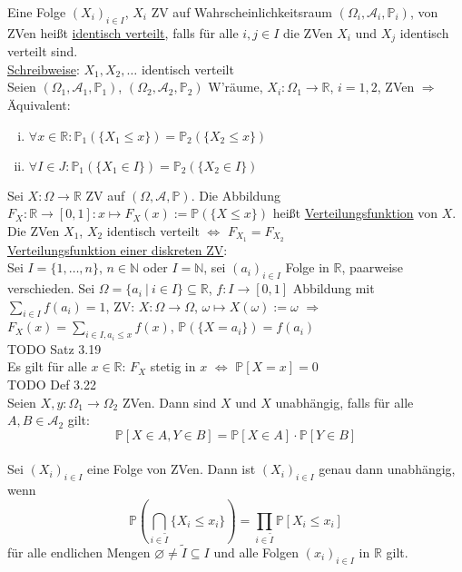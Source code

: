 \documentclass[a4paper]{article}
\newcommand{\ul}{\underline}
\begin{document}
Eine Folge $(X_i)_{i\in I}$, $X_i$ ZV auf Wahrscheinlichkeitsraum $(\Omega_i,\mathcal{A}_i,\mathbb{P}_i)$, von ZVen heißt \ul{identisch verteilt}, falls für alle $i,j\in I$ die ZVen $X_i$ und $X_j$ identisch verteilt sind.\\
\ul{Schreibweise}: $X_1,X_2,\dots$ identisch verteilt\\
Seien $(\Omega_1,\mathcal{A}_1,\mathbb{P}_1)$, $(\Omega_2,\mathcal{A}_2,\mathbb{P}_2)$ W'räume, $X_i:\Omega_1\rightarrow\mathbb{R}$, $i=1,2$, ZVen $\Rightarrow$ Äquivalent:
\begin{enumerate}[(i)]
	\item $\forall x\in\mathbb{R}:\mathbb{P}_1(\{X_1\leq x\})=\mathbb{P}_2(\{X_2\leq x\})$
	\item $\forall I\in J:\mathbb{P}_1(\{X_1\in I\})=\mathbb{P}_2(\{X_2\in I\})$
\end{enumerate}
Sei $X:\Omega\rightarrow\mathbb{R}$ ZV auf $(\Omega,\mathcal{A},\mathbb{P})$. Die Abbildung $F_X:\mathbb{R}\rightarrow\left[0,1\right]:x\mapsto F_X(x):=\mathbb{P}(\{X\leq x\})$ heißt \ul{Verteilungsfunktion} von $X$.\\
Die ZVen $X_1$, $X_2$ identisch verteilt $\Leftrightarrow$ $F_{X_1}=F_{X_2}$\\
\ul{Verteilungsfunktion einer diskreten ZV}:\\
Sei $I=\{1,\dots,n\}$, $n\in\mathbb{N}$ oder $I=\mathbb{N}$, sei $(a_i)_{i\in I}$ Folge in $\mathbb{R}$, paarweise verschieden. Sei $\Omega=\{a_i\ \vert\ i\in I\}\subseteq\mathbb{R}$, $f:I\rightarrow\left[0,1\right]$ Abbildung mit $\sum_{i\in I}f(a_i)=1$, ZV: $X:\Omega\rightarrow\Omega$, $\omega\mapsto X(\omega):=\omega$ $\Rightarrow$ $F_X(x)=\sum_{i\in I,a_i\leq x}f(x)$, $\mathbb{P}(\{X=a_i\})=f(a_i)$\\
TODO Satz 3.19\\
Es gilt für alle $x\in\mathbb{R}$: $F_X$ stetig in $x$ $\Leftrightarrow$ $\mathbb{P}\left[X=x\right]=0$\\
TODO Def 3.22\\
Seien $X,y:\Omega_1\rightarrow\Omega_2$ ZVen. Dann sind $X$ und $X$ unabhängig, falls für alle $A,B\in\mathcal{A_2}$ gilt: $$\mathbb{P}\left[X\in A,Y\in B\right]=\mathbb{P}\left[X\in A\right]\cdot\mathbb{P}\left[Y\in B\right]$$\\
Sei $(X_i)_{i\in I}$ eine Folge von ZVen. Dann ist $(X_i)_{i\in I}$ genau dann unabhängig, wenn $$\mathbb{P}\left(\bigcap_{i\in\tilde I}\{X_i\leq x_i\}\right)=\prod_{i\in\tilde I}\mathbb{P}\left[X_i\leq x_i\right]$$ für alle endlichen Mengen $\varnothing\neq \tilde I\subseteq I$ und alle Folgen $(x_i)_{i\in I}$ in $\mathbb{R}$ gilt.
\end{document}
